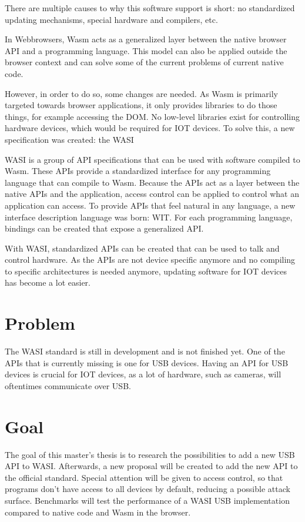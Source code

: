 There are multiple causes to why this software support is short: no standardized updating mechanisms, special hardware and compilers, etc.

In Webbrowsers, \acrfull{Wasm} acts as a generalized layer between the native browser API and a programming language. This model can also be applied outside the browser context and can solve some of the current problems of current native code.

However, in order to do so, some changes are needed. As \acrshort{Wasm} is primarily targeted towards browser applications, it only provides libraries to do those things, for example accessing the DOM. No low-level libraries exist for controlling hardware devices, which would be required for IOT devices. To solve this, a new specification was created: the \acrfull{WASI}

\acrshort{WASI} is a group of API specifications that can be used with software compiled to \acrshort{Wasm}. These APIs provide a standardized interface for any programming language that can compile to \acrshort{Wasm}. Because the APIs act as a layer between the native APIs and the application, access control can be applied to control what an application can access. To provide APIs that feel natural in any language, a new interface description language was born: \acrfull{WIT}. For each programming language, bindings can be created that expose a generalized API.

With \acrshort{WASI}, standardized APIs can be created that can be used to talk and control hardware. As the APIs are not device specific anymore and no compiling to specific architectures is needed anymore, updating software for IOT devices has become a lot easier.

\section*{Problem}

The \acrshort{WASI} standard is still in development and is not finished yet. One of the APIs that is currently missing is one for USB devices. Having an API for USB devices is crucial for IOT devices, as a lot of hardware, such as cameras, will oftentimes communicate over USB.

\section*{Goal}

The goal of this master's thesis is to research the possibilities to add a new USB API to WASI. Afterwards, a new proposal will be created to add the new API to the official standard. Special attention will be given to access control, so that programs don't have access to all devices by default, reducing a possible attack surface. Benchmarks will test the performance of a WASI USB implementation compared to native code and Wasm in the browser.

